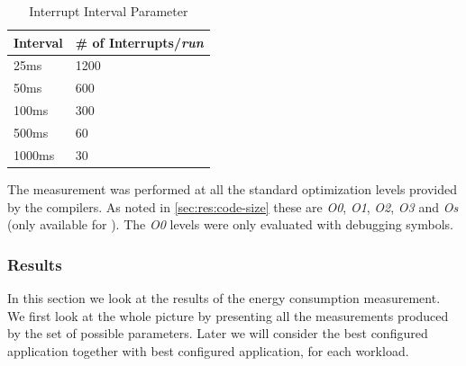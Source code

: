 \begin{table}[H]
  \centering
  \begin{tabular}{l|l}
    \textbf{Interval} & \textbf{\# of Interrupts/\emph{run}} \\
    \hline
    25ms & 1200 \\
    50ms & 600 \\
    100ms & 300 \\
    500ms & 60 \\
    1000ms & 30 \\
    \hline
  \end{tabular}
  \caption{Interrupt Interval Parameter}
  \label{tab:}
\end{table}

The measurement was performed at all the standard optimization levels provided by the compilers.
As noted in \autoref{sec:res:code-size} these are \emph{O0}, \emph{O1}, \emph{O2}, \emph{O3} and \emph{Os} (only available for {\C}).
The \emph{O0} levels were only evaluated with debugging symbols.

\subsubsection{Results}

In this section we look at the results of the energy consumption measurement.
We first look at the whole picture by presenting all the measurements produced by the set of possible parameters.
Later we will consider the best configured {\C} application together with best configured {\rust} application, for each workload.

